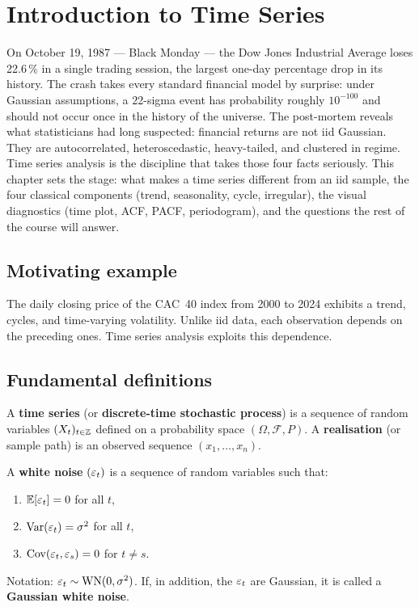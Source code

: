 \chapter{Introduction to Time Series}
\label{ch:intro}

On October 19, 1987 --- Black Monday --- the Dow Jones Industrial Average loses 22.6\,\% in a single trading session, the largest one-day percentage drop in its history. The crash takes every standard financial model by surprise: under Gaussian assumptions, a 22-sigma event has probability roughly $10^{-100}$ and should not occur once in the history of the universe. The post-mortem reveals what statisticians had long suspected: financial returns are not iid Gaussian. They are autocorrelated, heteroscedastic, heavy-tailed, and clustered in regime. Time series analysis is the discipline that takes those four facts seriously. This chapter sets the stage: what makes a time series different from an iid sample, the four classical components (trend, seasonality, cycle, irregular), the visual diagnostics (time plot, ACF, PACF, periodogram), and the questions the rest of the course will answer.

\section{Motivating example}
The daily closing price of the CAC~40 index from 2000 to 2024 exhibits a trend, cycles, and time-varying volatility. Unlike iid data, each observation depends on the preceding ones. Time series analysis exploits this dependence.

\section{Fundamental definitions}

\begin{definition}
A \textbf{time series} (or \textbf{discrete-time stochastic process}) is a sequence of random variables $(X_t)_{t\in\mathbb{Z}}$ defined on a probability space $(\Omega,\mathcal{F},P)$. A \textbf{realisation} (or sample path) is an observed sequence $(x_1,\ldots,x_n)$.
\end{definition}

\begin{definition}
A \textbf{white noise} $(\varepsilon_t)$ is a sequence of random variables such that:
\begin{enumerate}
\item $\mathbb{E}[\varepsilon_t]=0$ for all $t$,
\item $\operatorname{Var}(\varepsilon_t)=\sigma^2$ for all $t$,
\item $\operatorname{Cov}(\varepsilon_t,\varepsilon_s)=0$ for $t\neq s$.
\end{enumerate}
Notation: $\varepsilon_t\sim\mathrm{WN}(0,\sigma^2)$. If, in addition, the $\varepsilon_t$ are Gaussian, it is called a \textbf{Gaussian white noise}.
\end{definition}

